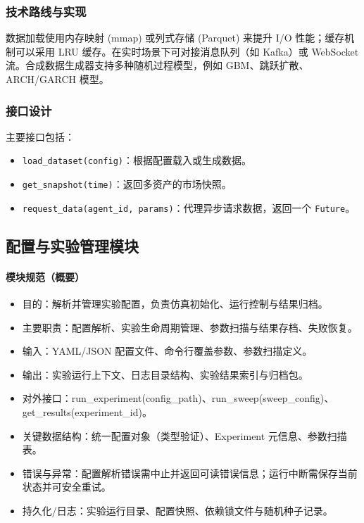 \subsubsection{技术路线与实现}
数据加载使用内存映射 (mmap) 或列式存储 (Parquet) 来提升 I/O 性能；缓存机制可以采用 LRU 缓存。在实时场景下可对接消息队列（如 Kafka）或 WebSocket 流。合成数据生成器支持多种随机过程模型，例如 GBM、跳跃扩散、ARCH/GARCH 模型。

\subsubsection{接口设计}
主要接口包括：
\begin{itemize}
  \item \verb|load_dataset(config)|：根据配置载入或生成数据。
  \item \verb|get_snapshot(time)|：返回多资产的市场快照。
  \item \verb|request_data(agent_id, params)|：代理异步请求数据，返回一个 \verb|Future|。
\end{itemize}

\subsection{配置与实验管理模块}

\paragraph{模块规范（概要）}
\begin{itemize}
  \item 目的：解析并管理实验配置，负责仿真初始化、运行控制与结果归档。
  \item 主要职责：配置解析、实验生命周期管理、参数扫描与结果存档、失败恢复。
  \item 输入：YAML/JSON 配置文件、命令行覆盖参数、参数扫描定义。
  \item 输出：实验运行上下文、日志目录结构、实验结果索引与归档包。
  \item 对外接口：run\_experiment(config\_path)、run\_sweep(sweep\_config)、get\_results(experiment\_id)。
  \item 关键数据结构：统一配置对象（类型验证）、Experiment 元信息、参数扫描表。
  \item 错误与异常：配置解析错误需中止并返回可读错误信息；运行中断需保存当前状态并可安全重试。
  \item 持久化/日志：实验运行目录、配置快照、依赖锁文件与随机种子记录。
\end{itemize}

